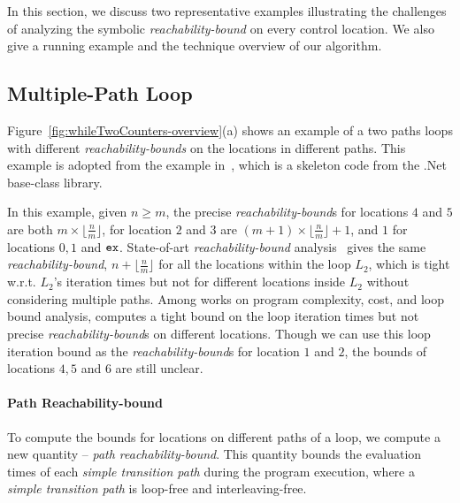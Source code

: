 In this section, we discuss two representative examples illustrating the
challenges of analyzing the symbolic
\emph{reachability-bound} on
every control location.
%
We also give a running example and the technique overview of our algorithm.

\subsection{Multiple-Path Loop}
\label{sec:overview-multiplepath}

Figure~\ref{fig:whileTwoCounters-overview}(a) shows an example of a two paths loops
with different \emph{reachability-bounds} on the locations in different paths.
This example is adopted from the example in~\cite{GulwaniZ10}, which
is a skeleton code from the .Net base-class library.

In this example, given $n \geq m$,
the precise \emph{reachability-bound}s for locations $4$ and $5$ are both $m \times \lfloor\frac{n}{m}\rfloor$,
for location $2$ and $3$ are $(m + 1) \times \lfloor\frac{n}{m}\rfloor + 1$, 
and $1$ for locations $0, 1$ and $\mathtt{ex}$. 
State-of-art \emph{reachability-bound} analysis~\cite{GulwaniZ10}
gives the same \emph{reachability-bound}, $n + \lfloor\frac{n}{m}\rfloor$ for all the locations within the loop $L_2$, which is tight w.r.t. $L_2$'s iteration times but not for different locations inside $L_2$ without considering multiple paths.
Among works on program complexity, cost, and loop bound analysis, \cite{GulwaniJK09} computes a tight bound on the loop iteration times but not precise \emph{reachability-bound}s on different locations.
Though we can use this loop iteration bound as the \emph{reachability-bound}s for location $1$ and $2$,
the bounds of locations $4, 5$ and $6$ are still unclear.


\paragraph{Path Reachability-bound}
To compute the bounds for locations on different paths of a loop, we compute a new quantity -- \emph{path reachability-bound}.
This quantity bounds the evaluation times of each \emph{simple transition path} during the program execution, where a \emph{simple transition path} is loop-free and interleaving-free.

